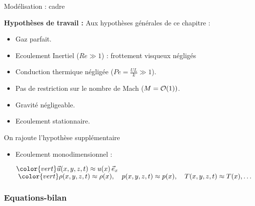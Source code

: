 \begin{frame}{Modélisation : cadre}

\small

\textbf{Hypothèses de travail :} \pause
Aux hypothèses générales de ce chapitre :  
\begin{itemize}
\item Gaz parfait.
\item Ecoulement Inertiel ($Re \gg 1$) : frottement visqueux négligés 
\item Conduction thermique négligée ($Pe = \frac{ U L}{k} \gg 1$).
\item Pas de restriction sur le nombre de Mach ($M = {\cal O}(1) ) $.
\item Gravité négligeable.
\item Ecoulement stationnaire.  
\end{itemize}
	
\smallskip
	
On rajoute l'hypothèse supplémentaire
\begin{itemize}
	\item[\checkmark] Ecoulement monodimensionnel : 
	
	$\color{vert} \myvec{u}(x, y, z, t) \approx u(x)\, \myvec{e}_x$ \quad
$\; \color{vert} \rho(x, y, z, t) \approx \rho(x),
\quad p(x, y, z, t) \approx p(x),
\quad T(x, y, z, t) \approx T(x), \ldots$
	
	
\end{itemize}	


\vspace{15mm}

\end{frame}


\subsubsection{Equations-bilan}

